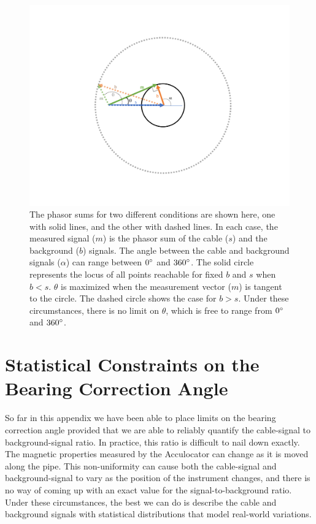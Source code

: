 \documentclass[paper=a4, fontsize=11pt]{scrartcl}
\numberwithin{equation}{section}		%
\numberwithin{figure}{section}			%
\numberwithin{table}{section}				%
\begin{document}
\begin{appendices}
\begin{figure}[H]
  \caption{The phasor sums for two different conditions are shown here, one with solid lines, and the other with dashed lines.  In each case, the measured signal ($m$) is the phasor sum of the cable ($s$) and the background ($b$) signals. The angle between the cable and background signals ($\alpha$) can range between $0\degree$ and $360\degree$.  The solid circle represents the locus of all points reachable for fixed $b$ and $s$ when $b < s$.  $\theta$ is maximized when the measurement vector ($m$) is tangent to the circle.  The dashed circle shows the case for $b > s$.  Under these circumstances, there is no limit on $\theta$, which is free to range from  $0\degree$ and $360\degree$. 
  }
  \label{fig:angle_limits}
  \centering
  \includegraphics[width=1.0\textwidth]{figures/angle_limits.pdf}
\end{figure}


    
\section{Statistical Constraints on the Bearing Correction Angle}
So far in this appendix we have been able to place limits on the bearing correction angle provided that we are able to reliably quantify the cable-signal to background-signal ratio.  In practice, this ratio is difficult to nail down exactly. The magnetic properties measured by the Acculocator can change as it is moved along the pipe.  This non-uniformity can cause both the cable-signal and background-signal to vary as the position of the instrument changes, and there is no way of coming up with an exact value for the signal-to-background ratio.  Under these circumstances, the best we can do is describe the cable and background signals with statistical distributions that model real-world variations.


\end{appendices}
\end{document}
